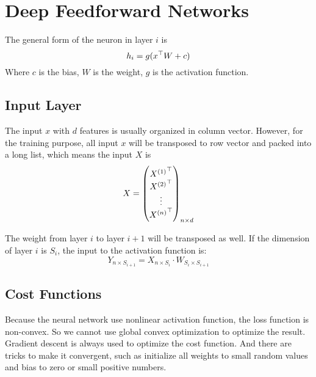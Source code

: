 
\section{Deep Feedforward Networks}



The general form of the neuron in layer $i$ is 
\begin{equation}
    h_i = g({x}^\top W + c)
\end{equation}
Where $c$ is the bias, $W$ is the weight, $g$ is the activation function.


\subsection{Input Layer}

\begin{definition}
    The input $x$ with $d$ features is usually organized in column vector. However, for the training purpose, all input $x$ will be transposed to row vector and packed into a long list, which means the input $X$ is
\begin{equation}
    X = \begin{pmatrix}
        {{X}^{(1)}}^\top \\
        {{X}^{(2)}}^\top \\
        \vdots \\
        {{X}^{(n)}}^\top \\
    \end{pmatrix}_{n \times d}
\end{equation}
\end{definition}



The weight from layer $i$ to layer $i+1$ will be transposed as well. If the dimension of layer $i$ is $S_i$, the input to the activation function is:
\begin{equation}
    Y_{n \times S_{i+1}} = X_{n \times S_{i}} \cdot W_{S_{i} \times S_{i+1}}
\end{equation}



\subsection{Cost Functions}

Because the neural network use nonlinear activation function, the loss function is non-convex. So we cannot use global convex optimization to optimize the result. Gradient descent is always used to optimize the cost function. And there are tricks to make it convergent, such as initialize all weights to small random values and bias to zero or small positive numbers.



